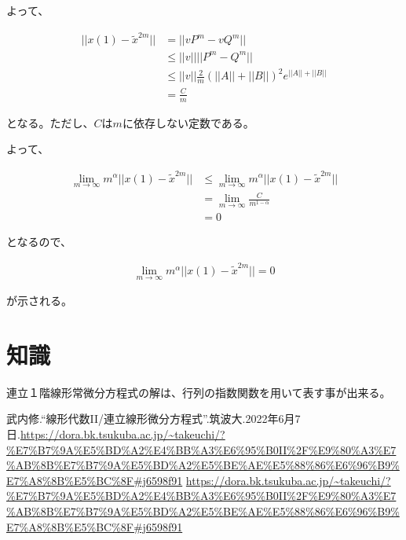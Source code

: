 \documentclass[a4paper, 10pt, dvipdfmx]{jlreq}
\begin{document}
よって、

\begin{align*}
    ||x(1)-\tilde{x}^{2m}|| & =||vP^m-vQ^m||                                                   \\
                            & \leq ||v||||P^m-Q^m||                                            \\
                            & \leq ||v||\frac{2}{m} \left(||A||+||B||\right)^2 e^{||A||+||B||} \\
                            & =\frac{C}{m}
\end{align*}

となる。ただし、$C$は$m$に依存しない定数である。

よって、

\begin{align*}
    \lim_{m \to \infty} m^\alpha ||x(1)-\tilde{x}^{2m}|| & \leq \lim_{m \to \infty} m^\alpha ||x(1)-\tilde{x}^{2m}|| \\
                                                         & =\lim_{m \to \infty} \frac{C}{m^{1-\alpha}}               \\
                                                         & =0
\end{align*}

となるので、

\begin{align*}
    \lim_{m \to \infty} m^\alpha ||x(1)-\tilde{x}^{2m}||=0
\end{align*}

が示される。

\section{知識}

連立１階線形常微分方程式の解は、行列の指数関数を用いて表す事が出来る。


\begin{thebibliography}{9}
    武内修.“線形代数II/連立線形微分方程式”.筑波大.2022年6月7日.\url{https://dora.bk.tsukuba.ac.jp/~takeuchi/?%E7%B7%9A%E5%BD%A2%E4%BB%A3%E6%95%B0II%2F%E9%80%A3%E7%AB%8B%E7%B7%9A%E5%BD%A2%E5%BE%AE%E5%88%86%E6%96%B9%E7%A8%8B%E5%BC%8F#j6598f91}
    \url{https://dora.bk.tsukuba.ac.jp/~takeuchi/?%E7%B7%9A%E5%BD%A2%E4%BB%A3%E6%95%B0II%2F%E9%80%A3%E7%AB%8B%E7%B7%9A%E5%BD%A2%E5%BE%AE%E5%88%86%E6%96%B9%E7%A8%8B%E5%BC%8F#j6598f91}
\end{thebibliography}
\end{document}
